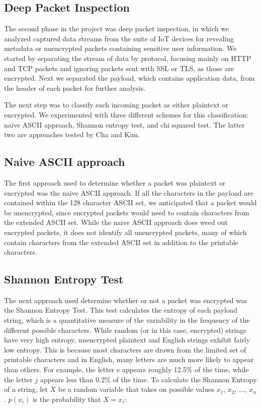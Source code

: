 \subsection{Deep Packet Inspection}

The second phase in the project was deep packet inspection, in which we analyzed captured data streams from the suite of IoT devices for revealing metadata or unencrypted packets containing sensitive user information. We started by separating the stream of data by protocol, focusing mainly on HTTP and TCP packets and ignoring packets sent with SSL or TLS, as those are encrypted. Next we separated the payload, which contains application data, from the header of each packet for further analysis. 

The next step was to classify each incoming packet as either plaintext or encrypted. We experimented with three different schemes for this classification: naive ASCII approach, Shannon entropy test, and chi squared test. The latter two are approaches tested by Cha and Kim.~\cite{chaMachineLearning}

\subsection{Naive ASCII approach}
The first approach used to determine whether a packet was plaintext or encrypted was the naive ASCII approach. If all the characters in the payload are contained within the 128 character ASCII set, we anticipated that a packet would be unencrypted, since encrypted packets would need to contain characters from the extended ASCII set. While the naive ASCII approach does weed out encrypted packets, it does not identify all unencrypted packets, many of which contain characters from the extended ASCII set in addition to the printable characters. 

\subsection{Shannon Entropy Test}
The next approach used determine whether or not a packet was encrypted was the Shannon Entropy Test. This test calculates the entropy of each payload string, which is a quantitative measure of the variability in the frequency of the different possible characters. While random (or in this case, encrypted) strings have very high entropy, unencrypted plaintext and English strings exhibit fairly low entropy. This is because most characters are drawn from the limited set of printable characters and in English, many letters are much more likely to appear than others. For example, the letter e appears roughly 12.5\% of the time, while the letter $j$ appears less than 0.2\% of the time. To calculate the Shannon Entropy of a string, let $X$ be a random variable that takes on possible values $x_1$, $x_2$, ..., $x_n$. $p(x_i)$ is the probability that $X = x_i$:

